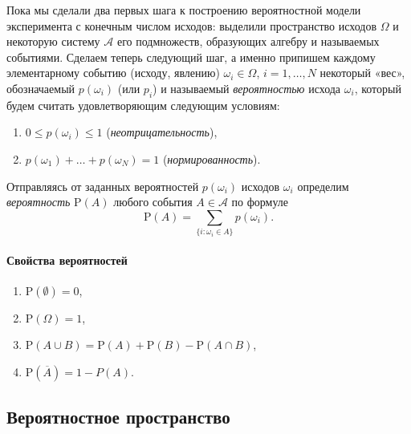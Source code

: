 \documentclass[11pt,a4paper]{article}
\providecommand{\tightlist}{%
      \setlength{\itemsep}{0pt}\setlength{\parskip}{0pt}}
\begin{document}
Пока мы сделали два первых шага к построению вероятностной модели
эксперимента с конечным числом исходов: выделили пространство исходов
\(\Omega\) и некоторую систему \(\mathcal{A}\) его подмножеств,
образующих алгебру и называемых событиями. Сделаем теперь следующий шаг,
а именно припишем каждому элементарному событию (исходу, явлению)
\(\omega_i \in \Omega\), \(i=1, \ldots, N\) некоторый «вес»,
обозначаемый \(p(\omega_i)\) (или \(p_i\)) и называемый
\emph{вероятностью} исхода \(\omega_i\), который будем считать
удовлетворяющим следующим условиям:

\begin{enumerate}
\def\labelenumi{\arabic{enumi}.}
\tightlist
\item
  \(0 \le p(\omega_i) \le 1\) (\emph{неотрицательность}),
\item
  \(p(\omega_1) + \ldots + p(\omega_N) = 1\) (\emph{нормированность}).
\end{enumerate}

Отправляясь от заданных вероятностей \(p(\omega_i)\) исходов
\(\omega_i\) определим \emph{вероятность} \(\mathrm{P}(A)\) любого
события \(A \in \mathcal{A}\) по формуле
\[ \mathrm{P}(A) = \sum_{\{i:\omega_i \in A\}} p(\omega_i). \]

\hypertarget{ux441ux432ux43eux439ux441ux442ux432ux430-ux432ux435ux440ux43eux44fux442ux43dux43eux441ux442ux435ux439}{%
\paragraph{Свойства
вероятностей}\label{ux441ux432ux43eux439ux441ux442ux432ux430-ux432ux435ux440ux43eux44fux442ux43dux43eux441ux442ux435ux439}}

\begin{enumerate}
\def\labelenumi{\arabic{enumi}.}
\tightlist
\item
  \(\mathrm{P}(\emptyset) = 0\),
\item
  \(\mathrm{P}(\Omega) = 1\),
\item
  \(\mathrm{P}(A \cup B) = \mathrm{P}(A) + \mathrm{P}(B) - \mathrm{P}(A \cap B)\),
\item
  \(\mathrm{P}(\overline{A}) = 1 - P(A)\).
\end{enumerate}

    \hypertarget{ux432ux435ux440ux43eux44fux442ux43dux43eux441ux442ux43dux43eux435-ux43fux440ux43eux441ux442ux440ux430ux43dux441ux442ux432ux43e}{%
\subsection{Вероятностное
пространство}\label{ux432ux435ux440ux43eux44fux442ux43dux43eux441ux442ux43dux43eux435-ux43fux440ux43eux441ux442ux440ux430ux43dux441ux442ux432ux43e}}
\end{document}
